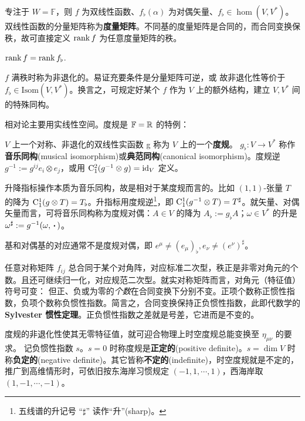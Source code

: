 专注于 $W=\mathbb F$，则 $f$ 为双线性函数、$f_\flat(\alpha)$ 为对偶矢量、$f_\flat\in\hom(V,V^*)$。
双线性函数的分量矩阵称为\textbf{度量矩阵}。不同基的度量矩阵是合同的，而合同变换保秩，故可直接定义 $\rank f$ 为任意度量矩阵的秩。

\begin{theorem}
    $\rank f=\rank f_\flat$.
\end{theorem}

$f$ 满秩时称为非退化的。易证充要条件是分量矩阵可逆，或
故非退化性等价于 $f_\flat\in\mathrm{Isom}(V,V^*)$。换言之，可规定好某个 $f$ 作为 $V$ 上的额外结构，建立 $V,V^*$ 间的特殊同构。

相对论主要用实线性空间。度规是 $\mathbb F=\mathbb{R}$ 的特例：

\begin{definition}
    $V$ 上一个对称、非退化的双线性实函数 g 称为 $V$ 上的一个\textbf{度规}。 $g_\flat:V\to V^*$ 称作\textbf{音乐同构}(musical isomorphism)或\textbf{典范同构}(canonical isomorphism)。度规逆 $g^{-1}:=g^{ij} e_i\otimes e_j$，或用 $\mathrm{C}^2_1(g^{-1}\otimes g)=\mathrm{id}_V$ 定义。
\end{definition}

\begin{definition}
    升降指标操作本质为音乐同构，故是相对于某度规而言的。比如 $(1,1)$-张量 $T$ 的降为
    $\mathrm{C}_1^1(g\otimes T)=T_\flat$。升指标用度规逆\footnote{五线谱的升记号 “$\sharp$” 读作“升”(sharp)。}，即 $\mathrm{C}_1^1(g^{-1}\otimes T)=T^\sharp$。就矢量、对偶矢量而言，可将音乐同构称为度规对偶：$A\in V$ 的降为 $A_\flat:=g_\flat A$；$\omega\in V^*$ 的升是 $\omega^\sharp:=g^{-1}(\omega,\oo)$。
\end{definition}

\begin{remark}
    基和对偶基的对应通常不是度规对偶，即 $e^\mu\ne (e_\mu)_\flat, e_\nu\ne (e^\nu)^\sharp$。
\end{remark}

任意对称矩阵 $f_{ij}$ 总合同于某个对角阵，对应标准二次型，秩正是非零对角元的个数。且还可继续归一化，对应规范二次型。就实对称矩阵而言，对角元（特征值）符号可变：
但正、负或为零的\textit{个数}在合同变换下分别不变。正项个数称正惯性指数，负项个数称负惯性指数。简言之，合同变换保持正负惯性指数，此即代数学的 \textbf{Sylvester 惯性定理}。正负惯性指数之差就是号差，它进而是不变的。

度规的非退化性使其无零特征值，就可迎合物理上时空度规总能变换至 $\eta_{\mu\nu}$ 的要求。
记负惯性指数 $s$。$s=0$ 时称度规是\textbf{正定的}(positive definite)。$s=\dim V$ 时称\textbf{负定的}(negative definite)。其它皆称\textbf{不定的}(indefinite)，时空度规就是不定的，推广到高维情形时，可依旧按东海岸习惯规定 $(-1,1,\cdots,1)$，西海岸取 $(1,-1,\cdots,-1)$。

